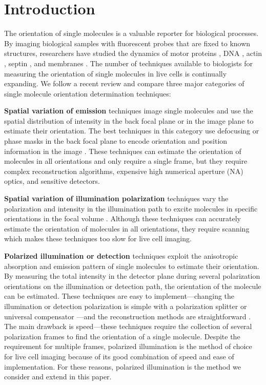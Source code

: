 \documentclass[10pt]{article}
\begin{document}
\section{Introduction}
The orientation of single molecules is a valuable reporter for biological
processes. By imaging biological samples with fluorescent probes that are fixed
to known structures, researchers have studied the dynamics of motor proteins
\cite{peterman2001, forkey2003}, DNA \cite{backer2016}, actin \cite{mehta2016},
septin \cite{demay2011, mcquilken2017}, and membranes \cite{anantharam2010}. The
number of techniques available to biologists for measuring the orientation of
single molecules in live cells is continually expanding. We follow a recent
review \cite{backlund2014} and compare three major categories of single molecule
orientation determination techniques:

\textbf{Spatial variation of emission} techniques image single molecules and use
the spatial distribution of intensity in the back focal plane \cite{lieb2004} or
in the image plane \cite{backer2014} to estimate their orientation. The best
techniques in this category use defocusing or phase masks in the back focal
plane to encode orientation and position information in the image
\cite{agrawal2012}. These techniques can estimate the orientation of
molecules in all orientations and only require a single frame, but they
require complex reconstruction algorithms, expensive high numerical aperture
(NA) optics, and sensitive detectors. 

\textbf{Spatial variation of illumination polarization} techniques vary the
polarization and intensity in the illumination path to excite molecules in
specific orientations in the focal volume \cite{debarre2004}. Although these
techniques can accurately estimate the orientation of molecules in all
orientations, they require scanning which makes these techniques too slow for
live cell imaging.

\textbf{Polarized illumination or detection} techniques exploit the anisotropic
absorption and emission pattern of single molecules to estimate their
orientation. By measuring the total intensity in the detector plane during
several polarization orientations on the illumination or detection path, the
orientation of the molecule can be estimated. These techniques are easy to
implement---changing the illumination or detection polarization is simple with a
polarization splitter \cite{mehta2016} or universal compensator
\cite{oldenbourg1995}---and the reconstruction methods are straightforward
\cite{fourkas2001, mehta2016, backer2016}. The main drawback is speed---these
techniques require the collection of several polarization frames to find the
orientation of a single molecule. Despite the requirement for multiple frames,
polarized illumination is the method of choice for live cell imaging because of
its good combination of speed and ease of implementation. For these reasons,
polarized illumination is the method we consider and extend in this paper.
\end{document}
